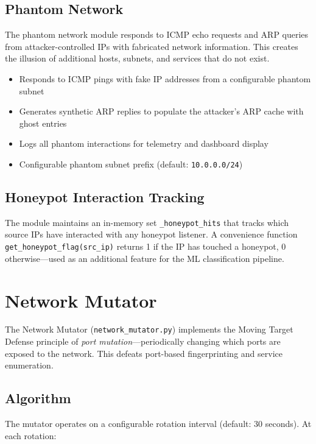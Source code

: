 \subsection{Phantom Network}

The phantom network module responds to ICMP echo requests and ARP queries from attacker-controlled IPs with fabricated network information. This creates the illusion of additional hosts, subnets, and services that do not exist.

\begin{itemize}
    \item Responds to ICMP pings with fake IP addresses from a configurable phantom subnet
    \item Generates synthetic ARP replies to populate the attacker's ARP cache with ghost entries
    \item Logs all phantom interactions for telemetry and dashboard display
    \item Configurable phantom subnet prefix (default: \texttt{10.0.0.0/24})
\end{itemize}

\subsection{Honeypot Interaction Tracking}

The module maintains an in-memory set \texttt{\_honeypot\_hits} that tracks which source IPs have interacted with any honeypot listener. A convenience function \texttt{get\_honeypot\_flag(src\_ip)} returns 1 if the IP has touched a honeypot, 0 otherwise---used as an additional feature for the ML classification pipeline.

\section{Network Mutator}

The Network Mutator (\texttt{network\_mutator.py}) implements the Moving Target Defense principle of \emph{port mutation}---periodically changing which ports are exposed to the network. This defeats port-based fingerprinting and service enumeration.

\subsection{Algorithm}

The mutator operates on a configurable rotation interval (default: 30 seconds). At each rotation:

